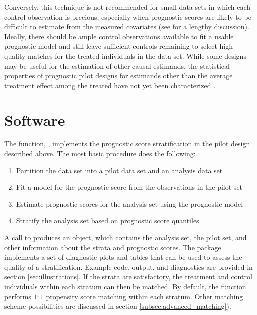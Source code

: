 Conversely, this technique is not recommended for small data sets in which each control observation is precious, especially when prognostic scores are likely to be difficult to estimate from the measured covariates (see \citet{aikens2020pilot} for a lengthy discussion).  Ideally, there should be ample control observations available to fit a usable prognostic model and still leave sufficient controls remaining to select high-quality matches for the treated individuals in the data set.  While some  designs may be useful for the estimation of other causal estimands, the statistical properties of prognostic pilot designs for estimands other than the average treatment effect among the treated have not yet been characterized \citep{aikens2020pilot}.

\section{Software}\label{sec:software}

The  function, , implements the prognostic score stratification in the pilot design described above. The most basic procedure does the following:

\begin{enumerate}
    \item Partition the data set into a pilot data set and an analysis data set
    \item Fit a model for the prognostic score from the observations in the pilot set
    \item Estimate prognostic scores for the analysis set using the prognostic model
    \item Stratify the analysis set based on prognostic score quantiles.
\end{enumerate}

A call to  produces an  object, which contains the analysis set, the pilot set, and other information about the strata and prognostic scores. The  package implements a set of diagnostic plots and tables that can be used to assess the quality of a stratification.  Example code, output, and diagnostics are provided in section \ref{sec:illustrations}. If the strata are satisfactory, the treatment and control individuals within each stratum can then be matched. By default, the  function performs $1:1$ propensity score matching within each stratum. Other matching scheme possibilities are discussed in section \ref{subsec:advanced_matching}).

